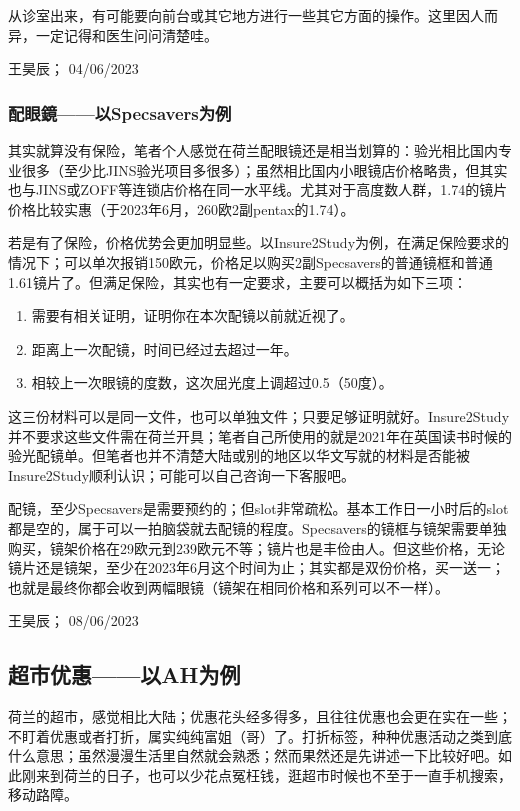 从诊室出来，有可能要向前台或其它地方进行一些其它方面的操作。这里因人而异，一定记得和医生问问清楚哇。
\begin{flushright}
王昊辰； 04/06/2023
\end{flushright}

\subsubsection{配眼鏡——以Specsavers为例}
其实就算没有保险，笔者个人感觉在荷兰配眼镜还是相当划算的：验光相比国内专业很多（至少比JINS验光项目多很多）；虽然相比国内小眼镜店价格略贵，但其实也与JINS或ZOFF等连锁店价格在同一水平线。尤其对于高度数人群，1.74的镜片价格比较实惠（于2023年6月，260欧2副pentax的1.74）。

若是有了保险，价格优势会更加明显些。以Insure2Study为例，在满足保险要求的情况下；可以单次报销150欧元，价格足以购买2副Specsavers的普通镜框和普通1.61镜片了。但满足保险，其实也有一定要求，主要可以概括为如下三项：

\begin{enumerate}
\item 需要有相关证明，证明你在本次配镜以前就近视了。
\item 距离上一次配镜，时间已经过去超过一年。
\item 相较上一次眼镜的度数，这次屈光度上调超过0.5（50度）。
\end{enumerate}

这三份材料可以是同一文件，也可以单独文件；只要足够证明就好。Insure2Study并不要求这些文件需在荷兰开具；笔者自己所使用的就是2021年在英国读书时候的验光配镜单。但笔者也并不清楚大陆或别的地区以华文写就的材料是否能被Insure2Study顺利认识；可能可以自己咨询一下客服吧。

配镜，至少Specsavers是需要预约的；但slot非常疏松。基本工作日一小时后的slot都是空的，属于可以一拍脑袋就去配镜的程度。Specsavers的镜框与镜架需要单独购买，镜架价格在29欧元到239欧元不等；镜片也是丰俭由人。但这些价格，无论镜片还是镜架，至少在2023年6月这个时间为止；其实都是双份价格，买一送一；也就是最终你都会收到两幅眼镜（镜架在相同价格和系列可以不一样）。
\begin{flushright}
王昊辰； 08/06/2023
\end{flushright}


\vspace{\betsubsec} %
\subsection{超市优惠——以AH为例}
荷兰的超市，感觉相比大陆；优惠花头经多得多，且往往优惠也会更在实在一些；不盯着优惠或者打折，属实纯纯富姐（哥）了。打折标签，种种优惠活动之类到底什么意思；虽然漫漫生活里自然就会熟悉；然而果然还是先讲述一下比较好吧。如此刚来到荷兰的日子，也可以少花点冤枉钱，逛超市时候也不至于一直手机搜索，移动路障。

